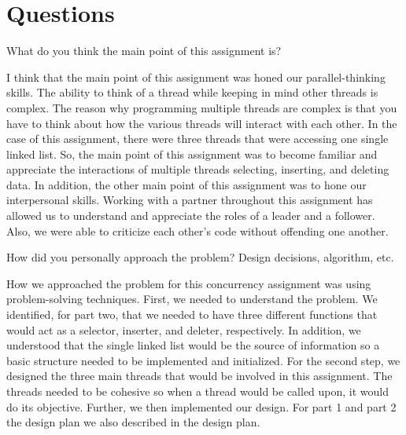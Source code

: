 \documentclass{article}
\newenvironment{question}[2][Question]{\begin{trivlist}
\item[\hskip \labelsep {\bfseries #1}\hskip \labelsep {\bfseries #2.}]}{\end{trivlist}}
\begin{document}
\section*{Questions}

\begin{question}{1}
What do you think the main point of this assignment is?
\end{question}
I think that the main point of this assignment was honed our parallel-thinking skills. The ability to think of a thread while keeping in mind other threads is complex. The reason why programming multiple threads are complex is that you have to think about how the various threads will interact with each other. In the case of this assignment, there were three threads that were accessing one single linked list. So, the main point of this assignment was to become familiar and appreciate the interactions of multiple threads selecting, inserting, and deleting data. In addition, the other main point of this assignment was to hone our interpersonal skills. Working with a partner throughout this assignment has allowed us to understand and appreciate the roles of a leader and a follower. Also, we were able to criticize each other's code without offending one another.


\vspace{0.25in} %

\begin{question}{2}
How did you personally approach the problem? Design decisions, algorithm, etc.
\end{question}
How we approached the problem for this concurrency assignment was using problem-solving techniques. First, we needed to understand the problem. We identified, for part two, that we needed to have three different functions that would act as a selector, inserter, and deleter, respectively. In addition, we understood that the single linked list would be the source of information so a basic structure needed to be implemented and initialized. For the second step, we designed the three main threads that would be involved in this assignment. The threads needed to be cohesive so when a thread would be called upon, it would do its objective. Further, we then implemented our design. For part 1 and part 2 the design plan we also described in the design plan.
\end{document}
